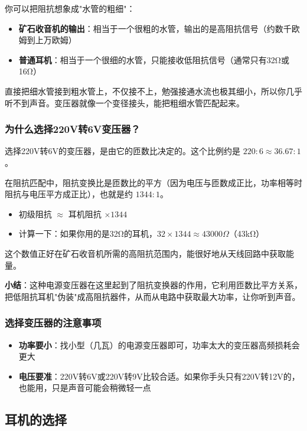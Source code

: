 \documentclass[12pt,UTF8]{ctexbook}
\begin{document}
你可以把阻抗想象成"水管的粗细"：
\begin{itemize}[leftmargin=3.5em]
    \item \textbf{矿石收音机的输出}：相当于一个很粗的水管，输出的是高阻抗信号（约数千欧姆到上万欧姆）
    \item \textbf{普通耳机}：相当于一个很细的水管，只能接收低阻抗信号（通常只有32Ω或16Ω）
\end{itemize}

直接把细水管接到粗水管上，不仅接不上，勉强接通水流也极其细小，所以你几乎听不到声音。变压器就像一个变径接头，能把粗细水管匹配起来。

\subsubsection{为什么选择220V转6V变压器？}

选择220V转6V的变压器，是由它的匝数比决定的。这个比例约是 $220 : 6 \approx 36.67 : 1$。

在阻抗匹配中，阻抗变换比是匝数比的平方（因为电压与匝数成正比，功率相等时阻抗与电压平方成正比），也就是约 $1344 : 1$。

\begin{itemize}[leftmargin=3.5em]
    \item 初级阻抗 $\approx$ 耳机阻抗 $\times 1344$
    \item 计算一下：如果你用的是32Ω的耳机，$32 \times 1344 \approx 43000\Omega$（43kΩ）
\end{itemize}

这个数值正好在矿石收音机所需的高阻抗范围内，能很好地从天线回路中获取能量。

\textbf{小结}：这种电源变压器在这里起到了阻抗变换器的作用，它利用匝数比平方关系，把低阻抗耳机"伪装"成高阻抗器件，从而从电路中获取最大功率，让你听到声音。

\subsubsection{选择变压器的注意事项}

\begin{itemize}[leftmargin=3.5em]
    \item \textbf{功率要小}：找小型（几瓦）的电源变压器即可，功率太大的变压器高频损耗会更大
    \item \textbf{电压要准}：220V转6V或220V转9V比较合适。如果你手头只有220V转12V的，也能用，只是声音可能会稍微轻一点
\end{itemize}

\subsection{耳机的选择}
\end{document}

